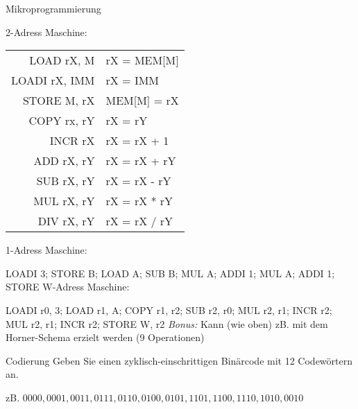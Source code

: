 \documentclass{exercisesheet}
\begin{document}
\begin{exercise}{Mikroprogrammierung}
\begin{multicols}{2}
    2-Adress Maschine:\par
    \begin{tabular}{|r|l|}
      \hline
      LOAD rX, M    & rX = MEM[M]  \\
      LOADI rX, IMM & rX = IMM     \\
      STORE M, rX   & MEM[M] = rX  \\
      COPY rx, rY   & rX = rY      \\
      INCR rX       & rX = rX + 1  \\
      ADD rX, rY    & rX = rX + rY \\
      SUB rX, rY    & rX = rX - rY \\
      MUL rX, rY    & rX = rX * rY \\
      DIV rX, rY    & rX = rX / rY \\
      \hline
    \end{tabular}
  \end{multicols}

  \begin{solution}
    1-Adress Maschine:\par LOADI 3; STORE B; LOAD A; SUB B; MUL A; ADDI 1; MUL A; ADDI 1; STORE W-Adress Maschine:\par LOADI r0, 3; LOAD r1, A; COPY r1, r2; SUB r2, r0; MUL r2, r1; INCR r2; MUL r2, r1; INCR r2; STORE W, r2\newline
    \textit{Bonus:} Kann (wie oben) zB. mit dem Horner-Schema erzielt werden (9 Operationen)
  \end{solution}
\end{exercise}

\begin{exercise}[5]{Codierung}
  Geben Sie einen zyklisch-einschrittigen Binärcode mit 12 Codewörtern an.

  \begin{solution}
    zB. $0000, 0001, 0011, 0111, 0110, 0100, 0101, 1101, 1100, 1110, 1010, 0010$
  \end{solution}
\end{exercise}
\end{document}

